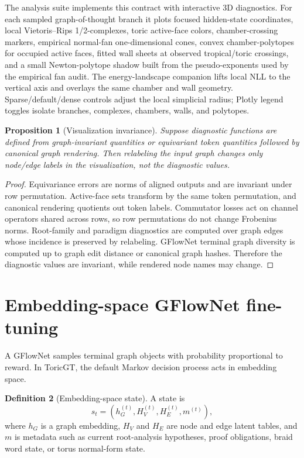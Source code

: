 \documentclass[11pt]{article}
\theoremstyle{definition}
\newtheorem{definition}{Definition}[section]
\theoremstyle{plain}
\newtheorem{proposition}[definition]{Proposition}
\theoremstyle{remark}
\numberwithin{equation}{section}
\begin{document}
The analysis suite implements this contract with interactive 3D diagnostics.  For each sampled graph-of-thought branch it plots focused hidden-state coordinates, local Vietoris--Rips 1/2-complexes, toric active-face colors, chamber-crossing markers, empirical normal-fan one-dimensional cones, convex chamber-polytopes for occupied active faces, fitted wall sheets at observed tropical/toric crossings, and a small Newton-polytope shadow built from the pseudo-exponents used by the empirical fan audit.  The energy-landscape companion lifts local NLL to the vertical axis and overlays the same chamber and wall geometry.  Sparse/default/dense controls adjust the local simplicial radius; Plotly legend toggles isolate branches, complexes, chambers, walls, and polytopes.

\begin{proposition}[Visualization invariance]
Suppose diagnostic functions are defined from graph-invariant quantities or equivariant token quantities followed by canonical graph rendering.  Then relabeling the input graph changes only node/edge labels in the visualization, not the diagnostic values.
\end{proposition}

\begin{proof}
Equivariance errors are norms of aligned outputs and are invariant under row permutation.  Active-face sets transform by the same token permutation, and canonical rendering quotients out token labels.  Commutator losses act on channel operators shared across rows, so row permutations do not change Frobenius norms.  Root-family and paradigm diagnostics are computed over graph edges whose incidence is preserved by relabeling.  GFlowNet terminal graph diversity is computed up to graph edit distance or canonical graph hashes.  Therefore the diagnostic values are invariant, while rendered node names may change.
\end{proof}

\section{Embedding-space GFlowNet fine-tuning}

A GFlowNet samples terminal graph objects with probability proportional to reward.  In ToricGT, the default Markov decision process acts in embedding space.

\begin{definition}[Embedding-space state]
A state is
\begin{equation}
  s_t=(h_G^{(t)},H_V^{(t)},H_E^{(t)},m^{(t)}),
\end{equation}
where $h_G$ is a graph embedding, $H_V$ and $H_E$ are node and edge latent tables, and $m$ is metadata such as current root-analysis hypotheses, proof obligations, braid word state, or torus normal-form state.
\end{definition}
\end{document}
